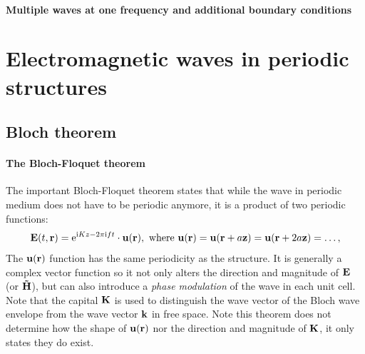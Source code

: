 \paragraph{Multiple waves at one frequency and additional boundary conditions}%

\section{Electromagnetic waves in periodic structures}
\subsection{Bloch theorem}

\paragraph{The Bloch-Floquet theorem}%

The important Bloch-Floquet theorem states that while the wave in periodic medium does not have to be periodic anymore, it is a product of two periodic functions:
\begin{equation} \mathbf{E}(t, {\mathbf{r}}) = \mathrm{e}^{\mathrm{i} Kz - 2\pi \mathrm{i} f t} \cdot \mathbf{u}({\mathbf{r}}), \text{ where } \mathbf{u}({\mathbf{r}}) = \mathbf{u}({\mathbf{r}}+a\mathbf{z}) = \mathbf{u}({\mathbf{r}}+2a\mathbf{z}) = \ldots, \label{eq_bloch}\end{equation} 
The $\mathbf{u}({\mathbf{r}})$ function has the same periodicity as the structure. It is generally a complex vector function so it not only alters the direction and magnitude of $\mathbf{E}$ (or  $\mathbf{\tilde{H}}$), but can also introduce a \textit{phase modulation} of the wave in each unit cell. Note that the capital ${\mathbf{K}}$ is used to distinguish the wave vector of the Bloch wave envelope from the wave vector ${\mathbf{k}}$ in free space. Note this theorem does not determine how the shape of $\mathbf{u}({\mathbf{r}})$ nor the direction and magnitude of ${\mathbf{K}}$, it only states they do exist.

